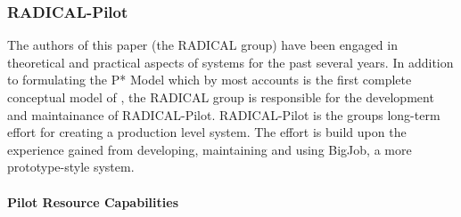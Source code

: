 \documentclass{sig-alternate}
\begin{document}

%
%
\subsubsection{RADICAL-Pilot}
\label{sec:radicalpilot}

The authors of this paper (the RADICAL group) have been engaged in theoretical
and practical aspects of \pilot systems for the past several years.
In addition to formulating the P* Model\cite{} which by most accounts is the
first complete conceptual model of \pilots, the RADICAL group is responsible
for the development and maintainance of RADICAL-Pilot\cite{}.
RADICAL-Pilot is the groups long-term effort for creating a production level
\pilot system.
The effort is build upon the experience gained from developing, maintaining and
using BigJob\cite{}, a more prototype-style \pilot system.

\paragraph{Pilot Resource Capabilities}
\end{document}
